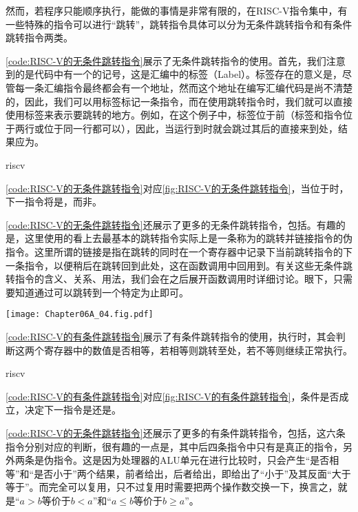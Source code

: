 然而，若程序只能顺序执行，能做的事情是非常有限的，在RISC-V指令集中，有一些特殊的指令可以进行“跳转”，跳转指令具体可以分为无条件跳转指令和有条件跳转指令两类。

\cref{code:RISC-V的无条件跳转指令}展示了无条件跳转指令的使用。首先，我们注意到的是代码中有一个的记号，这是汇编中的标签（Label）。标签存在的意义是，尽管每一条汇编指令最终都会有一个地址，然而这个地址在编写汇编代码是尚不清楚的，因此，我们可以用标签标记一条指令，而在使用跳转指令时，我们就可以直接使用标签来表示要跳转的地方。例如，在这个例子中，标签位于前（标签和指令位于两行或位于同一行都可以），因此，当运行到时就会跳过其后的直接来到处，结果应为。

\begin{Code}{riscv}
    
\end{Code}

\cref{code:RISC-V的无条件跳转指令}对应\cref{fig:RISC-V的无条件跳转指令}，当位于时，下一指令将是，而非。

\cref{code:RISC-V的无条件跳转指令}还展示了更多的无条件跳转指令，包括。有趣的是，这里使用的看上去最基本的跳转指令实际上是一条称为的跳转并链接指令的伪指令。这里所谓的链接是指在跳转的同时在一个寄存器中记录下当前跳转指令的下一条指令，以便稍后在跳转回到此处，这在函数调用中回用到。有关这些无条件跳转指令的含义、关系、用法，我们会在之后展开函数调用时详细讨论。眼下，只需要知道通过可以跳转到一个特定为止即可。
\begin{Figure}
    \texttt{[image: Chapter06A\_04.fig.pdf]}
\end{Figure}

\cref{code:RISC-V的有条件跳转指令}展示了有条件跳转指令的使用，执行时，其会判断这两个寄存器中的数值是否相等，若相等则跳转至处，若不等则继续正常执行。
\begin{Code}{riscv}
    
\end{Code}

\cref{code:RISC-V的有条件跳转指令}对应\cref{fig:RISC-V的有条件跳转指令}，条件是否成立，决定下一指令是还是。

\cref{code:RISC-V的无条件跳转指令}还展示了更多的有条件跳转指令，包括，这六条指令分别对应\code{==,!=,<,<=,>,>=}的判断，很有趣的一点是，其中后四条指令中只有是真正的指令，另外两条是伪指令。这是因为处理器的ALU单元在进行比较时，只会产生“是否相等”和“是否小于”两个结果，前者给出，后者给出，即给出了“小于”及其反面“大于等于”。而完全可以复用，只不过复用时需要把两个操作数交换一下，换言之，就是“$a>b$等价于$b<a$”和“$a\leq b$等价于$b\geq a$”。

